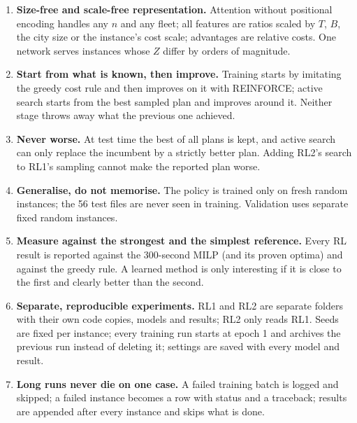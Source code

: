 \begin{enumerate}[leftmargin=*,label=\textbf{P\arabic*.}]
  \item \textbf{Size-free and scale-free representation.} Attention without positional encoding handles any $n$ and any fleet; all features are ratios scaled by $T$, $B$, the city size or the instance's cost scale; advantages are relative costs. One network serves instances whose $Z$ differ by orders of magnitude.

  \item \textbf{Start from what is known, then improve.} Training starts by imitating the greedy cost rule and then improves on it with REINFORCE; active search starts from the best sampled plan and improves around it. Neither stage throws away what the previous one achieved.

  \item \textbf{Never worse.} At test time the best of all plans is kept, and active search can only replace the incumbent by a strictly better plan. Adding RL2's search to RL1's sampling cannot make the reported plan worse.

  \item \textbf{Generalise, do not memorise.} The policy is trained only on fresh random instances; the 56 test files are never seen in training. Validation uses separate fixed random instances.

  \item \textbf{Measure against the strongest and the simplest reference.} Every RL result is reported against the 300-second MILP (and its proven optima) and against the greedy rule. A learned method is only interesting if it is close to the first and clearly better than the second.

  \item \textbf{Separate, reproducible experiments.} RL1 and RL2 are separate folders with their own code copies, models and results; RL2 only reads RL1. Seeds are fixed per instance; every training run starts at epoch 1 and archives the previous run instead of deleting it; settings are saved with every model and result.

  \item \textbf{Long runs never die on one case.} A failed training batch is logged and skipped; a failed instance becomes a row with status  and a traceback; results are appended after every instance and  skips what is done.
\end{enumerate}
